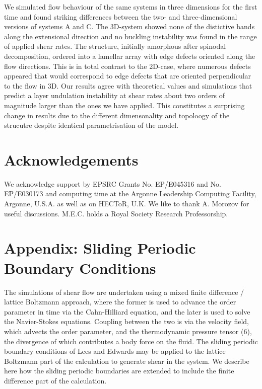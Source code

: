 \documentclass[8.5pt,twoside,twocolumn]{article}
\begin{document}
We simulated flow behaviour of the same systems in three dimensions for the first time and found striking differences between the two- and three-dimensional versions of systems A and C.
The 3D-system showed none of the distictive bands along the extensional direction and no buckling instability was found in the range of applied shear rates.
The structure, initially amorphous after spinodal decomposition, ordered into a lamellar array with edge defects oriented along the flow directions.
This is in total contrast to the 2D-case, where numerous defects appeared that would correspond to edge defects that are oriented perpendicular to the flow in 3D.
Our results agree with theoretical values and simulations that predict a layer undulation instability at shear rates about two orders of magnitude larger than the ones we have applied.
This constitutes a surprising change in results due to the different dimensonality and topoloogy of the strucutre despite identical parametrisation of the model.

\section{Acknowledgements}
We acknowledge support by EPSRC Grants No. EP/E045316 and No. EP/E030173 and computing time at the Argonne Leadership Computing Facility, Argonne, U.S.A. as well as on HECToR, U.K.
We like to thank A. Morozov for useful discussions. 
M.E.C. holds a Royal Society Research Professorship.

\section{Appendix: Sliding Periodic Boundary Conditions}

The simulations of shear flow are undertaken using a mixed finite
difference / lattice Boltzmann approach, where the former is used
to advance the order parameter in time via the Cahn-Hilliard equation,
and the later is used to solve the Navier-Stokes equations.
Coupling between the two is
via the velocity field, which advects the order parameter, and
the thermodynamic pressure tensor (6), the divergence of which
contributes a body force on the fluid. The sliding periodic
boundary conditions of Lees and Edwards\cite{leesedwards} may be
applied to the lattice Boltzmann part of the calculation
\cite{Wagner02,Adhikari05} to generate shear in the system. We
describe here how the sliding periodic boundaries are extended to
include the finite difference part of the calculation.
\end{document}
